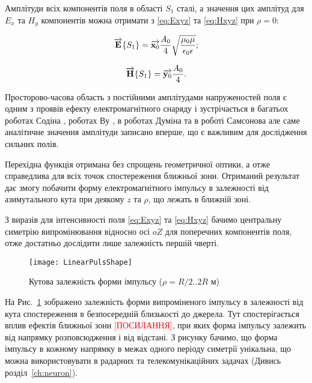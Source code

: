 Амплітуди всіх компонентів поля в області $ S_1 $ сталі, а значення 
цих амплітуд для $ E_x $ та $ H_y $ компонентів можна отримати з 
\eqref{eq:Exyz} та \eqref{eq:Hxyz} при $ \rho = 0 $:

\begin{equation*} \begin{aligned}
\overrightarrow{\mathbf E} \{ S_1 \} = 
\overrightarrow{\mathbf x_0} \frac{A_0}{4} 
\sqrt{\frac{\mu_0 \mu}{\epsilon_0 \epsilon}};
\end{aligned} \end{equation*}

\begin{equation*} \begin{aligned} 
\overrightarrow{\mathbf H} \{ S_1 \} = \overrightarrow{\mathbf y_0} \frac{A_0}{4}.
\end{aligned} \end{equation*}

Просторово-часова область з  постійними амплітудами напруженостей поля є 
одним з проявів ефекту електромагнітного снаряду і
зустрічається в багатьох роботах Содіна \cite{imp:Sodin1991, 
imp:Sodin1992-5, imp:Sodin1992-10, imp:Sodin1997}, роботах Ву 
\cite{imp:Wu1985, imp:Wu1987, imp:Wu1991}, в роботах Думіна
\cite{imp:Dumin1996} та в роботі Самсонова \cite{imp:Samsonov1986} але 
саме аналітичне значення амплітуди записано вперше, що є важливим для 
дослідження сильних полів.

Перехідна функція отримана без спрощень геометричної оптики, а отже 
справедлива для всіх точок спостереження ближньої зони. Отриманий результат 
дає змогу побачити форму електромагнітного імпульсу в залежності від 
азимутального кута при деякому $ z $ та $ \rho $, що лежать в ближній зоні.

З виразів для інтенсивності поля \eqref{eq:Exyz} та \eqref{eq:Hxyz} бачимо
центральну симетрію випромінювання відносно осі $ oZ $ для поперечних 
компонентів поля, отже достатньо дослідити лише залежність першій чверті.

\begin{figure}[h] \begin{center}
\texttt{[image: LinearPulsShape]}
\caption{Кутова залежність форми імпульсу ($ \rho = R/2 .. 2R $ м)} 
\label{fig:emp_shape}
\end{center} \end{figure}

На Рис.~\ref{fig:emp_shape} зображено залежність форми випроміненого 
імпульсу в залежності від кута спостереження в безпосередній близькості 
до джерела. Тут спостерігається вплив ефектів ближньої зони 
\textcolor{red}{[ПОСИЛАННЯ]}, при яких форма імпульсу залежить від напрямку 
розповсюдження і від відстані. З рисунку бачимо, що форма імпульсу в 
кожному напрямку в межах одного періоду симетрії унікальна, що можна 
використовувати в радарних та телекомунікаційних задачах 
(Дивись розділ~\ref{ch:neuron}).

